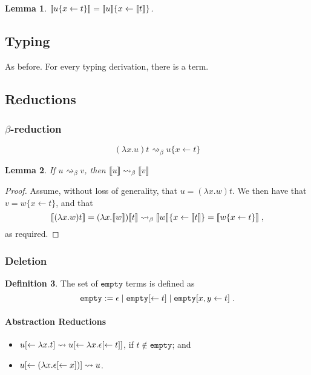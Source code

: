 \documentclass[11pt,a4paper]{article}
\theoremstyle{definition}
\newtheorem{definition}{Definition}
\theoremstyle{plain}
\newtheorem{lemma}[definition]{Lemma}
\theoremstyle{remark}
\begin{document}
\begin{lemma}
	${\llbracket{u\{x\leftarrow t\}}\rrbracket}={\llbracket{u}\rrbracket}\{x\leftarrow{\llbracket{t}\rrbracket}\}$.
\end{lemma}

\subsection{Typing}

As before. For every typing derivation, there is a term.

\subsection{Reductions}

\subsubsection{$\beta$-reduction}

\[
(\lambda x.u)t \rightsquigarrow_\beta u\{x\leftarrow t\}
\]


\begin{lemma}
	If $u\rightsquigarrow_\beta v$, then ${\llbracket{u}\rrbracket}\rightsquigarrow_\beta{\llbracket{v}\rrbracket}$
\end{lemma}

\begin{proof}
	Assume, without loss of generality, that $u=(\lambda x.w)t$. We then have that $v=w\{x\leftarrow t\}$, and that
	\[
	{\llbracket{(\lambda x.w)t}\rrbracket}=(\lambda x.{\llbracket{w}\rrbracket}){\llbracket{t}\rrbracket}\rightsquigarrow_\beta{\llbracket{w}\rrbracket}\{x\leftarrow{\llbracket{t}\rrbracket}\}={\llbracket{w\{x\leftarrow t\}}\rrbracket}\;,
	\]
	as required.
\end{proof}

\subsubsection{Deletion}

\newcommand{\tempty}{{\mathtt{empty}}}

\begin{definition}
	The set of $\tempty$ terms is defined as
	\[\tempty:=\epsilon\;|\;\tempty\terdel{t}\;|\;\tempty\terdup{x}{y}{t}\;.\]
\end{definition}

\paragraph{Abstraction Reductions}

\begin{itemize}
	\item $u{[\leftarrow{\lambda x.t}]}\rightsquigarrow u{[\leftarrow{\lambda x.\epsilon{[\leftarrow{t}]}}]}$, if $t\not\in\tempty$; and
	\item $u{[\leftarrow{(\lambda x.\epsilon{[\leftarrow{x}]})}]}\rightsquigarrow u$.
\end{itemize}
\end{document}
